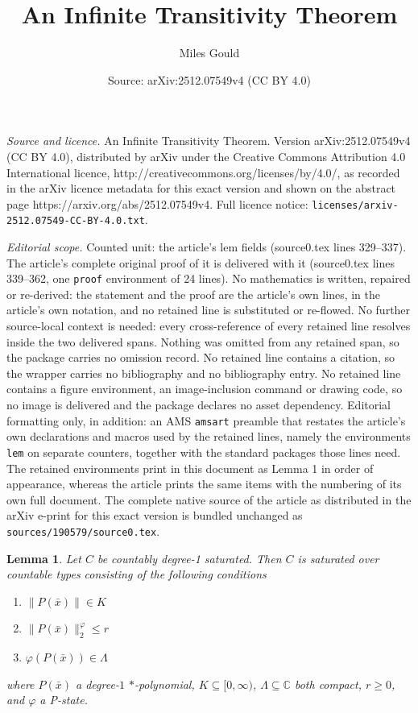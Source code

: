\documentclass[10pt,a4paper]{amsart}
\title{An Infinite Transitivity Theorem}
\author{Miles Gould}
\date{Source: arXiv:2512.07549v4 (CC BY 4.0)}
\newtheorem{lem}{Lemma}
\begin{document}
\maketitle

\noindent\emph{Source and licence.} An Infinite Transitivity Theorem. Version arXiv:2512.07549v4 (CC BY 4.0), distributed by arXiv under the Creative Commons Attribution 4.0 International licence, http://creativecommons.org/licenses/by/4.0/, as recorded in the arXiv licence metadata for this exact version and shown on the abstract page https://arxiv.org/abs/2512.07549v4. Full licence notice: \texttt{licenses/arxiv-2512.07549-CC-BY-4.0.txt}.\par\smallskip

\noindent\textit{Editorial scope.} Counted unit: the article's lem fields (source0.tex lines 329--337). The article's complete original proof of it is delivered with it (source0.tex lines 339--362, one \texttt{proof} environment of 24 lines). No mathematics is written, repaired or re-derived: the statement and the proof are the article's own lines, in the article's own notation, and no retained line is substituted or re-flowed.  No further source-local context is needed: every cross-reference of every retained line resolves inside the two delivered spans.  Nothing was omitted from any retained span, so the package carries no omission record.  No retained line contains a citation, so the wrapper carries no bibliography and no bibliography entry.  No retained line contains a figure environment, an image-inclusion command or drawing code, so no image is delivered and the package declares no asset dependency.  Editorial formatting only, in addition: an AMS \texttt{amsart} preamble that restates the article's own declarations and macros used by the retained lines, namely the environments \texttt{lem} on separate counters, together with the standard packages those lines need.  The retained environments print in this document as Lemma 1 in order of appearance, whereas the article prints the same items with the numbering of its own full document.  The complete native source of the article as distributed in the arXiv e-print for this exact version is bundled unchanged as \texttt{sources/190579/source0.tex}.
\begin{lem}\label{fields}
    Let $C$ be countably degree-1 saturated. Then $C$ is saturated over countable types consisting of the following conditions
    \begin{enumerate}
        \item $\|P(\bar{x})\| \in K$
        \item $\|P(\bar{x})\|^\varphi_2 \leq r$
        \item $\varphi(P(\bar{x})) \in \Lambda$
    \end{enumerate}
    where $P(\bar{x})$ a degree-$1$ $*$-polynomial, $K\subseteq[0,\infty)$, $\Lambda\subseteq\mathbb{C}$ both compact, $r\geq 0$, and $\varphi$ a P-state.
\end{lem}
\end{document}
